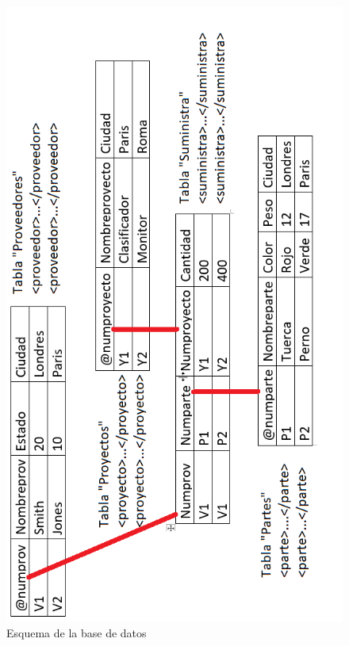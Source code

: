\documentclass{examen}
\begin{document}
\begin{figure}[h]
    \caption{Esquema de la base de datos}
    \label{figura1}
    \includegraphics[width=\linewidth]{examen-img/BaseDatosProveedoresPartesProyectos.png}
\end{figure}
\end{document}
